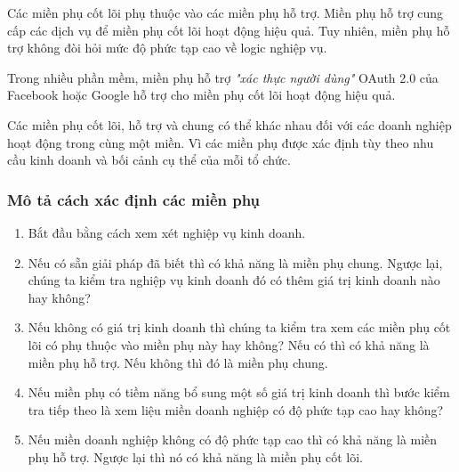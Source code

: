 
Các miền phụ cốt lõi phụ thuộc vào các miền phụ hỗ trợ. Miền phụ hỗ trợ cung cấp các dịch vụ để miền phụ cốt lõi hoạt động hiệu quả. Tuy nhiên, miền phụ hỗ trợ không đòi hỏi mức độ phức tạp cao về logic nghiệp vụ.

\begin{example} Trong nhiều phần mềm, miền phụ hỗ trợ \textit{"xác thực người dùng"} OAuth 2.0 của Facebook hoặc Google hỗ trợ cho miền phụ cốt lõi hoạt động hiệu quả.

\end{example}


Các miền phụ cốt lõi, hỗ trợ và chung có thể khác nhau đối với các doanh nghiệp hoạt động trong cùng một miền. Vì các miền phụ được xác định tùy theo nhu cầu kinh doanh và bối cảnh cụ thể của mỗi tổ chức.

\subsubsection{Mô tả cách xác định các miền phụ}

\begin{enumerate}

    \item Bắt đầu bằng cách xem xét nghiệp vụ kinh doanh.

    \item Nếu có sẵn giải pháp đã biết thì có khả năng là miền phụ chung. Ngược lại, chúng ta kiểm tra nghiệp vụ kinh doanh đó có thêm giá trị kinh doanh nào hay không?

    \item Nếu không có giá trị kinh doanh thì chúng ta kiểm tra xem các miền phụ cốt lõi có phụ thuộc vào miền phụ này hay không? Nếu có thì có khả năng là miền phụ hỗ trợ. Nếu không thì đó là miền phụ chung.

    \item Nếu miền phụ có tiềm năng bổ sung một số giá trị kinh doanh thì bước kiểm tra tiếp theo là xem liệu miền doanh nghiệp có độ phức tạp cao hay không?

    \item Nếu miền doanh nghiệp không có độ phức tạp cao thì có khả năng là miền phụ hỗ trợ. Ngược lại thì nó có khả năng là miền phụ cốt lõi.

\end{enumerate}

